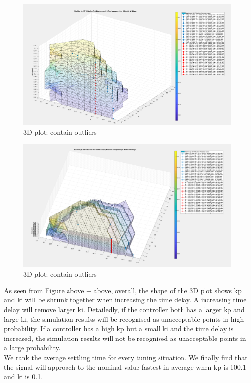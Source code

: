 \documentclass{report}
\begin{document}
\begin{figure}[htbp]
\centering
\includegraphics[width = .819\textwidth]{figure/5_4_1_without_Outlier1.png}
\caption{3D plot: contain outliers}
\label{5_4_1_without_Outlier1}
\end{figure}

\begin{figure}[htbp]
\centering
\includegraphics[width = .819\textwidth]{figure/5_4_1_without_Outlier2.png}
\caption{3D plot: contain outliers}
\label{5_4_1_without_Outlier2}
\end{figure}


As seen from Figure above + above, overall, the shape of the 3D plot shows kp and ki will be shrunk together when increasing the time delay. A increasing time delay will remove larger ki. Detailedly, if the controller both has a larger kp and large ki, the simulation results will be recognised as unacceptable points in high probability. If a controller has a high kp but a small ki and the time delay is increased, the simulation results will not be recognised as unacceptable points in a large probability.\\

We rank the average settling time for every tuning situation. We finally find that the signal will approach to the nominal value fastest in average when kp is 100.1 and ki is 0.1.\\
\end{document}
